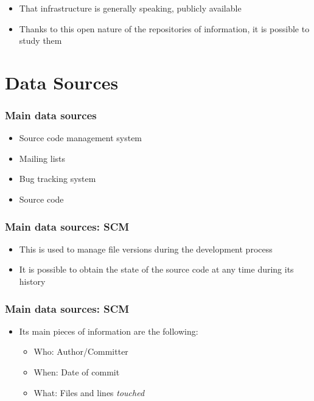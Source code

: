 \documentclass{beamer}
\begin{document}

\begin{frame}
 \frametitle{}
 \begin{itemize}
 \item That infrastructure is generally speaking, publicly available
 \item Thanks to this open nature of the repositories of information, it 
 is possible to study them
 \end{itemize}
\end{frame}



\section{Data Sources}
\begin{frame}
 \frametitle{Main data sources}
 \begin{itemize}
  \item Source code management system
  \item Mailing lists
  \item Bug tracking system
  \item Source code
 \end{itemize}
\end{frame}


\begin{frame}
 \frametitle{Main data sources: SCM}
 \begin{itemize}
 \item This is used to manage file versions during the development process
 \item It is possible to obtain the state of the source code at any time during its history
 \end{itemize}
\end{frame}



\begin{frame}
 \frametitle{Main data sources: SCM}
 \begin{itemize}
 \item Its main pieces of information are the following:
  \begin{itemize}
  \item Who:  Author/Committer
  \item When: Date of commit
  \item What: Files and lines \emph{touched}
  \end{itemize}
 \end{itemize}


\end{frame}
\end{document}

